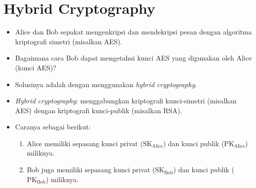 \documentclass{article}
\begin{document}

\section*{Hybrid Cryptography}

\begin{itemize}
    \item Alice dan Bob sepakat mengenkripsi dan mendekripsi pesan dengan algoritma kriptografi simetri (misalkan AES).
    \item Bagaimana cara Bob dapat mengetahui kunci AES yang digunakan oleh Alice (kunci AES)?
    \item Solusinya adalah dengan menggunakan \textit{hybrid cryptography}.
    \item \textit{Hybrid cryptography}: menggabungkan kriptografi kunci-simetri (misalkan AES) dengan kriptografi kunci-publik (misalkan RSA).
    \item Caranya sebagai berikut:
    \begin{enumerate}
        \item Alice memiliki sepasang kunci privat ($\text{SK}_{\text{Alice}}$) dan kunci publik ($\text{PK}_{\text{Alice}}$) miliknya.
        \item Bob juga memiliki sepasang kunci privat ($\text{SK}_{\text{Bob}}$) dan kunci publik ($\text{PK}_{\text{Bob}}$) miliknya.
    \end{enumerate}
\end{itemize}
\end{document}
